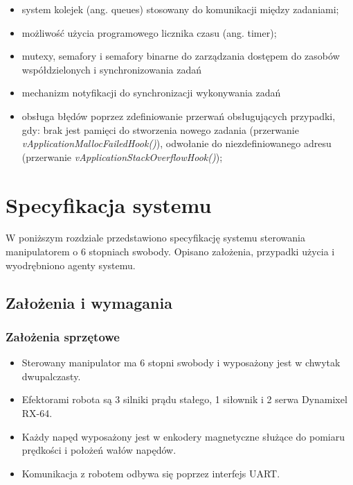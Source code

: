 \documentclass[a4paper, 12pt, twoside]{article}
\begin{document}
\begin{itemize}
\item system kolejek (ang. queues) stosowany do komunikacji między zadaniami;
\item możliwość użycia programowego licznika czasu (ang. timer);
\item mutexy, semafory i semafory binarne do zarządzania dostępem do zasobów współdzielonych i synchronizowania zadań
\item mechanizm notyfikacji do synchronizacji wykonywania zadań
\item obsługa błędów poprzez zdefiniowanie przerwań obsługujących przypadki, gdy: brak jest pamięci do stworzenia nowego zadania (przerwanie \textit{vApplicationMallocFailedHook()}), odwołanie do niezdefiniowanego adresu (przerwanie \textit{vApplicationStackOverflowHook()});
\end{itemize}

\newpage
\vspace*{1.5 cm}
\section{Specyfikacja systemu}
\vspace{1.5 cm}
W poniższym rozdziale przedstawiono specyfikację systemu sterowania manipulatorem o 6 stopniach swobody. Opisano założenia, przypadki użycia i wyodrębniono agenty systemu.
\subsection{Założenia i wymagania}

\subsubsection{Założenia sprzętowe}
\begin{itemize}
\item Sterowany manipulator ma 6 stopni swobody i wyposażony jest w chwytak dwupalczasty.
\item Efektorami robota są 3 silniki prądu stałego, 1 siłownik i 2 serwa Dynamixel RX-64.
\item Każdy napęd wyposażony jest w enkodery magnetyczne służące do pomiaru prędkości i położeń wałów napędów.
\item Komunikacja z robotem odbywa się poprzez interfejs UART.
\end{itemize}
\end{document}
